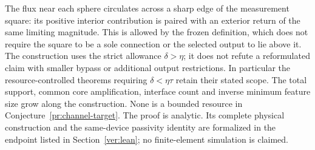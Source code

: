 \begin{remark}\label{uc:scope}
The flux near each sphere circulates across a sharp edge of the
measurement square: its positive interior contribution is paired
with an exterior return of the same limiting magnitude. This is
allowed by the frozen definition, which does not require the
square to be a sole connection or the selected output to lie
above it. The construction uses the strict allowance $\delta>\eta$;
it does not refute a reformulated claim with smaller bypass or
additional output restrictions. In particular the resource-controlled
theorems requiring $\delta<\eta\tau$ retain their stated scope.
The total support, common core amplification, interface count and
inverse minimum feature size grow along the construction. None is
a bounded resource in Conjecture~\ref{pr:channel-target}.
The proof is analytic. Its complete physical construction and the
same-device passivity identity are formalized in the endpoint listed
in Section~\ref{ver:lean}; no finite-element simulation is claimed.
\end{remark}
